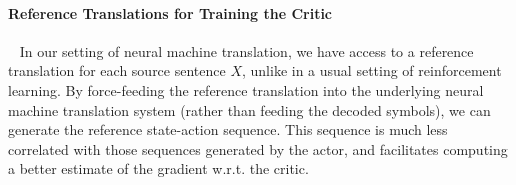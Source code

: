 

\paragraph{Reference Translations for Training the Critic}~
In our setting of neural machine translation, we have access to a reference translation for each source sentence $X$, unlike in a usual setting of reinforcement learning. By force-feeding the reference translation into the underlying neural machine translation system (rather than feeding the decoded symbols), we can generate the reference state-action sequence. This sequence is much less correlated with those sequences generated by the actor, and facilitates computing a better estimate of the gradient w.r.t. the critic. 

